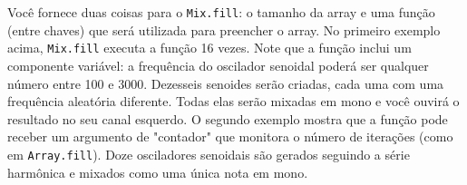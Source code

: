 Você fornece duas coisas para o \texttt{Mix.fill}: o tamanho da array e uma função (entre chaves) que será utilizada para preencher o array. No primeiro exemplo acima, \texttt{Mix.fill} executa a função 16 vezes. Note que a função inclui um componente variável: a frequência do oscilador senoidal poderá ser qualquer número entre 100 e 3000. Dezesseis senoides serão criadas, cada uma com uma frequência aleatória diferente. Todas elas serão mixadas em mono e você ouvirá o resultado no seu canal esquerdo.
O segundo exemplo mostra que a função pode receber um argumento de "contador" que monitora o número de iterações (como em \texttt{Array.fill}). Doze osciladores senoidais são gerados seguindo a série harmônica e mixados como uma única nota em mono.
